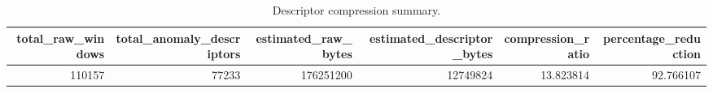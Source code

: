 \begin{table}[t]
\centering
\begin{tabular}{rrrrrr}
\toprule
total\_raw\_windows & total\_anomaly\_descriptors & estimated\_raw\_bytes & estimated\_descriptor\_bytes & compression\_ratio & percentage\_reduction \\
\midrule
110157 & 77233 & 176251200 & 12749824 & 13.823814 & 92.766107 \\
\bottomrule
\end{tabular}
\caption{Descriptor compression summary.}
\label{tab:compression}
\end{table}
